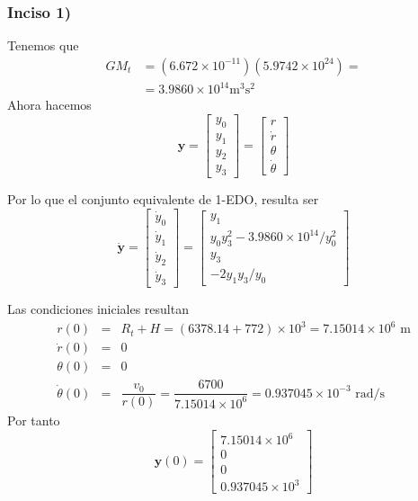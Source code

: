 \begin{frame}
\frametitle{Inciso 1)}
Tenemos que
\[ \begin{split} G M_{t} &= (6.672 \times 10^{-11}) (5.9742 \times 10^{24})  = \\
 &= 3.9860 \times 10^{14} \mbox{m}^{3} \mbox{s}^{2} \end{split} \]
Ahora hacemos
\[ \mathbf{y} = \begin{bmatrix}
y_{0} \\
y_{1} \\
y_{2} \\
y_{3}
\end{bmatrix} =
\begin{bmatrix}
r \\
\dot{r} \\
\theta \\
\dot{\theta}
\end{bmatrix}
\]
\end{frame}
\begin{frame}
Por lo que el conjunto equivalente de 1-EDO, resulta ser
\[ \dot{\mathbf{y}} = \begin{bmatrix}
\dot{y}_{0} \\
\dot{y}_{1} \\
\dot{y}_{2} \\
\dot{y}_{3}
\end{bmatrix} =
\begin{bmatrix}
y_{1} \\
y_{0} y_{3}^{2} - 3.9860 \times 10^{14}/y_{0}^{2} \\
y_{3} \\
-2 y_{1} y_{3} / y_{0}
\end{bmatrix} \]
\end{frame}
\begin{frame}
Las condiciones iniciales resultan
\fontsize{12}{12}\selectfont
\begin{eqnarray*}
r(0) &=& R_{t} + H = (6378.14+772) \times 10^{3} = 7.15014 \times 10^{6} \mbox{ m} \\
\dot{r}(0) &=& 0 \\
\theta(0) &=& 0 \\
\dot{\theta}(0) &=& \dfrac{v_{0}}{r(0)} = \dfrac{6700}{7.15014 \times 10^{6}} = 0.937045 \times 10^{-3} \mbox{ rad/s}
\end{eqnarray*}
\fontsize{14}{14}\selectfont
Por tanto
\[ \mathbf{y}(0) = 
\begin{bmatrix}
7.15014 \times 10^{6} \\
0 \\
0 \\
0.937045 \times 10^{3}
\end{bmatrix}
\]
\end{frame}
